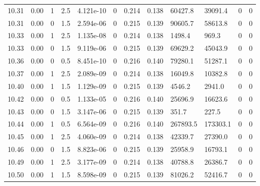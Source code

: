 \documentclass[preview]{standalone}
\begin{document}
{{{{{{{{{{{{{{{{{{\begin{tabular}{L{1.2cm}C{1.2cm} C{0.3cm}C{0.5cm} C{1.4cm}C{1.4cm} C{1.4cm}C{1.4cm} C{1.6cm}C{1.6cm} C{1.6cm}C{1.6cm}}
  10.31  &  0.00  & 1     & 2.5 &  4.121e-10  & 0  &  0.214&   0.138& 60427.8 & 39091.4   &  0 & 0  \\ 
  10.31  &  0.00  & 0     & 1.5 &  2.594e-06  & 0  &  0.215&   0.139& 90605.7 & 58613.8   &  0 & 0  \\ 
  10.33  &  0.00  & 1     & 2.5 &  1.135e-08  & 0  &  0.214&   0.138& 1498.4 & 969.3   &  0 & 0  \\ 
  10.33  &  0.00  & 0     & 1.5 &  9.119e-06  & 0  &  0.215&   0.139& 69629.2 & 45043.9   &  0 & 0  \\ 
  10.36  &  0.00  & 0     & 0.5 &  8.451e-10  & 0  &  0.216&   0.140& 79280.1 & 51287.1   &  0 & 0  \\ 
  10.37  &  0.00  & 1     & 2.5 &  2.089e-09  & 0  &  0.214&   0.138& 16049.8 & 10382.8   &  0 & 0  \\ 
  10.40  &  0.00  & 1     & 1.5 &  1.129e-09  & 0  &  0.215&   0.139& 4546.2 & 2941.0   &  0 & 0  \\ 
  10.42  &  0.00  & 0     & 0.5 &  1.133e-05  & 0  &  0.216&   0.140& 25696.9 & 16623.6   &  0 & 0  \\ 
  10.43  &  0.00  & 0     & 1.5 &  3.147e-06  & 0  &  0.215&   0.139& 351.7 & 227.5   &  0 & 0  \\ 
  10.44  &  0.00  & 1     & 0.5 &  6.564e-09  & 0  &  0.216&   0.140& 267893.5 & 173303.1   &  0 & 0  \\ 
  10.45  &  0.00  & 1     & 2.5 &  4.060e-09  & 0  &  0.214&   0.138& 42339.7 & 27390.0   &  0 & 0  \\ 
  10.46  &  0.00  & 0     & 1.5 &  8.823e-06  & 0  &  0.215&   0.139& 25958.9 & 16793.1   &  0 & 0  \\ 
  10.49  &  0.00  & 1     & 2.5 &  3.177e-09  & 0  &  0.214&   0.138& 40788.8 & 26386.7   &  0 & 0  \\ 
  10.50  &  0.00  & 1     & 1.5 &  8.598e-09  & 0  &  0.215&   0.139& 81026.2 & 52416.7   &  0 & 0  \\ 
\hline 
\end{tabular} 

}}}}}}}}}}}}}}}}}}
\end{document}
